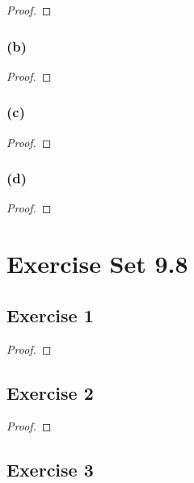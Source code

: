 \documentclass[14pt]{extarticle}
\begin{document}
\begin{proof}

\end{proof}

\subsubsection{(b)}

\begin{proof}

\end{proof}

\subsubsection{(c)}

\begin{proof}

\end{proof}

\subsubsection{(d)}

\begin{proof}

\end{proof}

\section{Exercise Set 9.8}

\subsection{Exercise 1}

\begin{proof}

\end{proof}

\subsection{Exercise 2}

\begin{proof}

\end{proof}

\subsection{Exercise 3}
\end{document}

